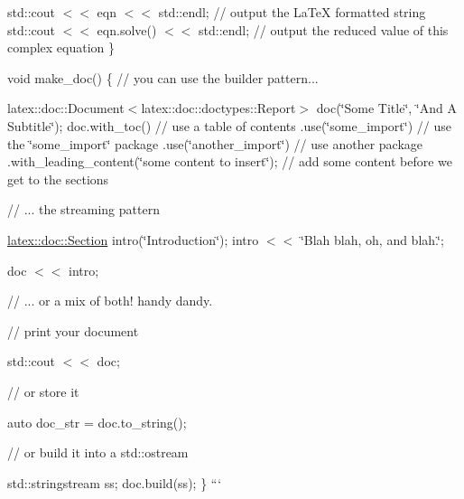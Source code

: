 std\-::cout $<$$<$ eqn $<$$<$ std\-::endl; // output the La\-Te\-X formatted string std\-::cout $<$$<$ eqn.\-solve() $<$$<$ std\-::endl; // output the reduced value of this complex equation \}

void make\-\_\-doc() \{ // you can use the builder pattern...

latex\-::doc\-::\-Document$<$latex\-::doc\-::doctypes\-::\-Report$>$ doc(\char`\"{}\-Some Title\char`\"{}, \char`\"{}\-And A Subtitle\char`\"{}); doc.\-with\-\_\-toc() // use a table of contents .use(\char`\"{}some\-\_\-import\char`\"{}) // use the \char`\"{}some\-\_\-import\char`\"{} package .use(\char`\"{}another\-\_\-import\char`\"{}) // use another package .with\-\_\-leading\-\_\-content(\char`\"{}some content to insert\char`\"{}); // add some content before we get to the sections

// ... the streaming pattern

\hyperlink{classlatex_1_1doc_1_1Section}{latex\-::doc\-::\-Section} intro(\char`\"{}\-Introduction\char`\"{}); intro $<$$<$ \char`\"{}\-Blah blah, oh, and blah.\char`\"{};

doc $<$$<$ intro;

// ... or a mix of both! handy dandy.

// print your document

std\-::cout $<$$<$ doc;

// or store it

auto doc\-\_\-str = doc.\-to\-\_\-string();

// or build it into a std\-::ostream

std\-::stringstream ss; doc.\-build(ss); \} ``` 
